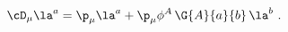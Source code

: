 \begin{equation}
  \cD_\mu \la^a = \p_\mu \la^a + \p_\mu \phi^A\, \G{A}{a}{b}\, \la^b\ .
 \end{equation}

